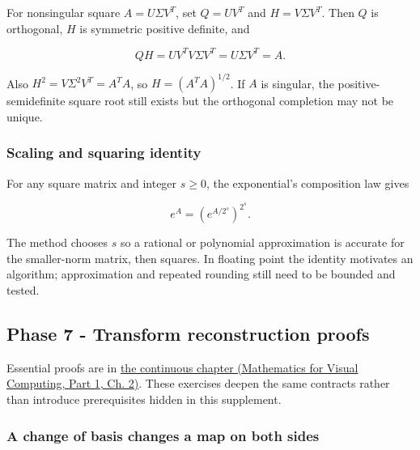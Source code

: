 \hypertarget{02-foundations-ii-ch039-right-polar-decomposition-from-the-svd}{}

For nonsingular square \(A=U\Sigma V^T\), set \(Q=UV^T\) and \(H=V\Sigma V^T\). Then \(Q\) is orthogonal, \(H\) is symmetric positive definite, and

\[
QH=UV^TV\Sigma V^T=U\Sigma V^T=A.
\]

Also \(H^2=V\Sigma^2V^T=A^TA\), so \(H=(A^TA)^{1/2}\). If \(A\) is singular, the positive-semidefinite square root still exists but the orthogonal completion may not be unique.

\subsubsection{Scaling and squaring identity}\label{02-foundations-ii-ch039-scaling-and-squaring-identity}

\hypertarget{02-foundations-ii-ch039-scaling-and-squaring-identity}{}

For any square matrix and integer \(s\ge0\), the exponential's composition law gives

\[
e^A=\left(e^{A/2^s}\right)^{2^s}.
\]

The method chooses \(s\) so a rational or polynomial approximation is accurate for the smaller-norm matrix, then squares. In floating point the identity motivates an algorithm; approximation and repeated rounding still need to be bounded and tested.

\subsection{Phase 7 - Transform reconstruction proofs}\label{02-foundations-ii-ch039-phase-7---transform-reconstruction-proofs}

\hypertarget{02-foundations-ii-ch039-phase-7---transform-reconstruction-proofs}{}

Essential proofs are in \href{../02-Mathematics-for-Visual-Computing-P01/main.pdf\#nameddest=01-foundations-i-ch018-keep-the-promises-visible-while-moving-between-representations}{the continuous chapter (Mathematics for Visual Computing, Part 1, Ch. 2)}. These exercises deepen the same contracts rather than introduce prerequisites hidden in this supplement.

\subsubsection{A change of basis changes a map on both sides}\label{02-foundations-ii-ch039-a-change-of-basis-changes-a-map-on-both-sides}

